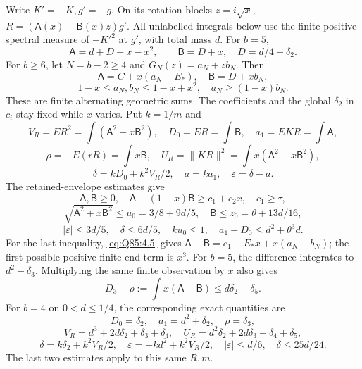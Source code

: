 Write \(K'=\allowbreak -K,\allowbreak g'=\allowbreak -g\).
On its rotation blocks \(z=\allowbreak i\sqrt x\),
\(R=\allowbreak (\mathsf A(x)-\mathsf B(x)z)g'\).
All unlabelled integrals below use the finite positive spectral measure of
\(-K'^2\) at \(g'\), with total mass \(d\).
For \(b=\allowbreak 5\),
\[
 \mathsf A=d+D+x-x^2,\qquad\mathsf B=D+x,
 \quad D=d/4+\delta_2.                                   \tag{Q85.4.4}\label{eq:Q85:4.4}
\]
For \(b\ge\allowbreak 6\), let \(N=\allowbreak b-2\ge\allowbreak 4\) and \(G_N(z)=\allowbreak a_N+zb_N\). Then
\[
 \mathsf A=C+x(a_N-E_*),\quad
 \mathsf B=D+x b_N,                                  \tag{Q85.4.5}\label{eq:Q85:4.5}
\]
\[
 1-x\le a_N,b_N\le1-x+x^2,\quad a_N\ge(1-x)b_N.
\]
These are finite alternating geometric sums. The coefficients and the global
\(\delta_2\) in \(c_i\) stay fixed while \(x\) varies.
Put \(k=\allowbreak 1/m\) and
\[
 V_R=ER^2=\int(\mathsf A^2+x\mathsf B^2),\quad
 D_0=ER=\int\mathsf B,\quad a_1=EKR=\int\mathsf A,
\]
\[
 \rho=-E(rR)=\int x\mathsf B,\quad
 U_R=\|KR\|^2=\int x(\mathsf A^2+x\mathsf B^2),
\]
\[
 \delta=kD_0+k^2V_R/2,\quad a=ka_1,\quad
 \varepsilon=\delta-a.                              \tag{Q85.4.6}\label{eq:Q85:4.6}
\]
The retained-envelope estimates give
\[
 \mathsf A,\mathsf B\ge0,\quad
 \mathsf A-(1-x)\mathsf B\ge c_1+c_2x,\quad c_1\ge\tau,
\]
\[
 \sqrt{\mathsf A^2+x\mathsf B^2}\le u_0=3/8+9d/5,
 \quad \mathsf B\le z_0=\theta+13d/16,                \tag{Q85.4.7}\label{eq:Q85:4.7}
\]
\[
 |\varepsilon|\le3d/5,\quad \delta\le6d/5,\quad ku_0\le1,
 \quad a_1-D_0\le d^2+\theta^3d.                     \tag{Q85.4.8}\label{eq:Q85:4.8}
\]
For the last inequality, \eqref{eq:Q85:4.5} gives
\(\mathsf A-\mathsf B=\allowbreak c_1-E_*x+x(a_N-b_N)\);
the first possible positive finite end term is \(x^3\).
For \(b=\allowbreak 5\), the difference integrates to \(d^2-\delta_3\).
Multiplying the same finite observation by \(x\) also gives
\[
 D_3-\rho:=\int x(\mathsf A-\mathsf B)
 \le d \delta_2+\delta_5.                                     \tag{Q85.4.9}\label{eq:Q85:4.9}
\]
For \(b=\allowbreak 4\) on \(0<\allowbreak d\le\allowbreak 1/4\), the corresponding exact quantities are
\[
 D_0=\delta_2,\quad a_1=d^2+\delta_2,\quad \rho=\delta_3,
\]
\[
 V_R=d^3+2d\delta_2+\delta_3+\delta_4,\quad
 U_R=d^2\delta_2+2d\delta_3+\delta_4+\delta_5,
\]
\[
 \delta=k\delta_2+k^2V_R/2,\quad
 \varepsilon=-kd^2+k^2V_R/2,
 \quad |\varepsilon|\le d/6,\quad\delta\le25d/24.     \tag{Q85.4.10}\label{eq:Q85:4.10}
\]
The last two estimates apply to this same \(R,\allowbreak m\).

